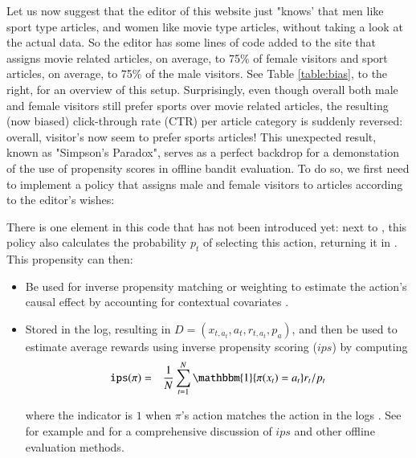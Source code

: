 \documentclass{jss}
\begin{document}
Let us now suggest that the editor of this website just "knows' that men like sport type articles, and women like movie type articles, without taking a look at the actual data. So the editor has some lines of code added to the site that assigns movie related articles, on average, to 75\% of female visitors and sport articles, on average, to 75\% of the male visitors. See Table \ref{table:bias}, to the right, for an overview of this setup. Surprisingly, even though overall both male and female visitors still prefer sports over movie related articles, the resulting (now biased) click-through rate (CTR) per article category is suddenly reversed: overall, visitor's now seem to prefer sports articles! This unexpected result, known as "Simpson's Paradox", serves as a perfect backdrop for a demonstation of the use of propensity scores in offline bandit evaluation. To do so, we first need to implement a policy that assigns male and female visitors to articles according to the editor's wishes:


There is one element in this code that has not been introduced yet: next to , this policy also calculates the probability $p_t$ of selecting this action, returning it in . This propensity can then:


\begin{itemize}
 \item{Be used for inverse propensity matching or weighting \cite{Austin2011} to estimate the action's causal effect by accounting for contextual covariates \cite{Imbens2015,Pearl2009}. }

 \item{Stored in the log, resulting in \( D = (x_{t,a_t},a_{t},r_{t,a_t},p_a) \), and then be used to estimate average rewards using inverse propensity scoring ($ips$) by computing
\begin{eqnarray}
\texttt{ips}(\pi) & = & \frac{1}{N} \sum_{t=1}^{N} \mathbbm{1} \{ \pi(x_t) = a_t \} r_t / p_t
\end{eqnarray}

where the indicator is $1$ when $\pi$'s action matches the action in the logs \citep{kruijswijk2018streamingbandit}. See for example \citet{Agarwal2014,Dudik2011} and \citet{Swaminathan2015}for a comprehensive discussion of $ips$ and other offline evaluation methods.}

\end{itemize}
\end{document}
